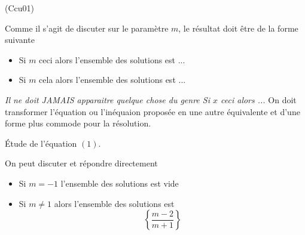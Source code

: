 \begin{tiny}(Ccu01)\end{tiny} Comme il s'agit de discuter sur le paramètre $m$, le résultat doit être de la forme suivante
\begin{itemize}
 \item Si $m$ ceci alors l'ensemble des solutions est ...
 \item Si $m$ cela alors l'ensemble des solutions est ...
\end{itemize}
\emph{Il ne doit JAMAIS apparaitre quelque chose du genre \og Si $x$ ceci alors ...\fg}\newline
On doit transformer l'équation ou l'inéquaion proposée en une autre équivalente et d'une forme plus commode pour la résolution.

\begin{center}
\'Etude de l'équation $(1)$.  
\end{center}
On peut discuter et répondre directement
\begin{itemize}
 \item Si $m = -1$ l'ensemble des solutions est vide
 \item Si $m \neq 1$  alors l'ensemble des solutions est
\begin{displaymath}
 \left\lbrace \frac{m-2}{m+1}\right\rbrace 
\end{displaymath}
\end{itemize}

